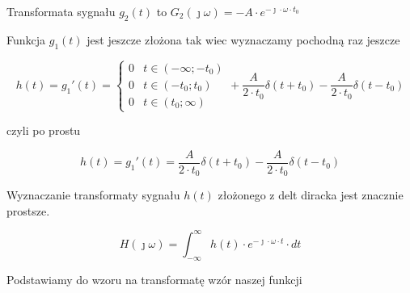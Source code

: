 \begin{task}
Transformata sygnału $g_2(t)$ to $G_2(\jmath \omega)=-A \cdot e^{-\jmath \cdot \omega \cdot t_0}$

Funkcja $g_1(t)$ jest jeszcze złożona tak wiec wyznaczamy pochodną raz jeszcze 

\begin{equation}
h(t)=g_1'(t)=\begin{cases}
0 & t \in \left( -\infty; -t_0 \right ) \\
0 & t \in \left( -t_0; t_0 \right ) \\
0 & t \in \left( t_0; \infty \right )
\end{cases} + \frac{A}{2\cdot t_0} \delta(t+t_0) - \frac{A}{2\cdot t_0} \delta(t-t_0)
\end{equation}

czyli po prostu

\begin{equation}
h(t)=g_1'(t)= \frac{A}{2\cdot t_0} \delta(t+t_0) - \frac{A}{2\cdot t_0} \delta(t-t_0)
\end{equation}

\begin{figure}[H]
  \centering
\end{figure}

Wyznaczanie transformaty sygnału $h(t)$ złożonego z delt diracka jest znacznie prostsze. 

\begin{equation}
H(\jmath \omega )=\int_{-\infty }^{\infty}h(t) \cdot e^{-\jmath \cdot \omega \cdot t}\cdot dt
\end{equation}

Podstawiamy do wzoru na transformatę wzór naszej funkcji


\end{task}
